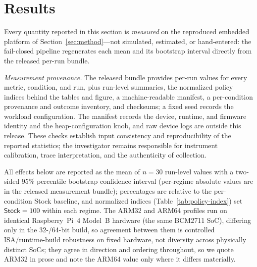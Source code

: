 \section{Results}
\label{sec:results}

Every quantity reported in this section is \emph{measured} on the reproduced
embedded platform of Section~\ref{sec:method}---not simulated, estimated, or
hand-entered: the fail-closed pipeline regenerates each mean and its bootstrap
interval directly from the released per-run bundle.

\noindent\emph{Measurement provenance.}\quad
The released bundle provides per-run values for every metric, condition, and run,
plus run-level summaries, the normalized policy indices behind the tables and
figure, a machine-readable manifest, a per-condition provenance and outcome
inventory, and checksums; a fixed seed records the workload configuration. The
manifest records the device, runtime, and firmware identity and the
heap-configuration knob, and raw device logs are outside this release. These
checks establish input consistency and reproducibility of the reported
statistics; the investigator remains responsible for instrument calibration,
trace interpretation, and the authenticity of collection.



All effects below are reported as the mean of $n{=}30$ run-level values with a
two-sided $95\%$ percentile bootstrap confidence interval (per-regime absolute
values are in the released measurement bundle);
percentages are relative to the per-condition \textsf{Stock}
baseline, and normalized indices (Table~\ref{tab:policy-index}) set
$\textsf{Stock}{=}100$ within each regime. The \textsf{ARM32} and \textsf{ARM64}
profiles run on identical Raspberry~Pi~4 Model~B hardware (the same BCM2711 SoC),
differing only in the 32-/64-bit build, so agreement between them is controlled
ISA/runtime-build robustness on fixed hardware, not diversity across physically
distinct SoCs; they agree in direction and ordering throughout, so we quote ARM32
in prose and note the ARM64 value only where it differs materially.


